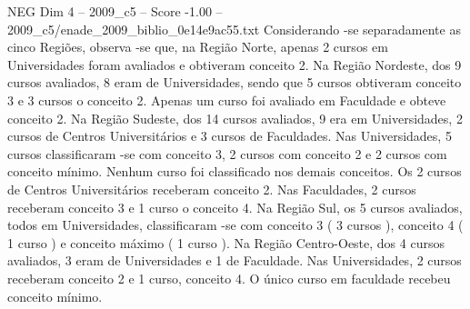 \begin{textsample}{NEG Dim 4 – 2009\_c5 – Score -1.00 – 2009\_c5/enade\_2009\_biblio\_0e14e9ac55.txt}
Considerando -se separadamente as cinco Regiões, observa -se que, na Região Norte, apenas 2 cursos em Universidades foram avaliados e obtiveram conceito 2.
Na Região Nordeste, dos 9 cursos avaliados, 8 eram de Universidades, sendo que 5 cursos obtiveram conceito 3 e 3 cursos o conceito 2.
Apenas um curso foi avaliado em Faculdade e obteve conceito 2.
Na Região Sudeste, dos 14 cursos avaliados, 9 era em Universidades, 2 cursos de Centros Universitários e 3 cursos de Faculdades.
Nas Universidades, 5 cursos classificaram -se com conceito 3, 2 cursos com conceito 2 e 2 cursos com conceito mínimo.
Nenhum curso foi classificado nos demais conceitos.
Os 2 cursos de Centros Universitários receberam conceito 2.
Nas Faculdades, 2 cursos receberam conceito 3 e 1 curso o conceito 4.
Na Região Sul, os 5 cursos avaliados, todos em Universidades, classificaram -se com conceito 3 ( 3 cursos ), conceito 4 ( 1 curso ) e conceito máximo ( 1 curso ).
Na Região Centro-Oeste, dos 4 cursos avaliados, 3 eram de Universidades e 1 de Faculdade.
Nas Universidades, 2 cursos receberam conceito 2 e 1 curso, conceito 4.
O único curso em faculdade recebeu conceito mínimo.

\end{textsample}
